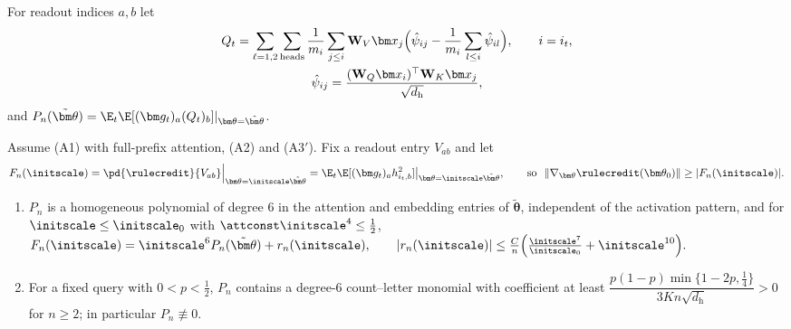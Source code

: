 For readout indices $a,b$ let
\begin{gather*}
 Q_t=\sum_{\ell=1,2}\sum_{\mathrm{heads}}\frac{1}{m_i}\sum_{j\le i}\mathbf W_V\bm x_j\Bigl(\hat\psi_{ij}-\frac{1}{m_i}\sum_{l\le i}\hat\psi_{il}\Bigr),\qquad i=i_t,\\
 \hat\psi_{ij}=\frac{(\mathbf W_Q\bm x_i)^\top\mathbf W_K\bm x_j}{\sqrt{d_{\mathrm h}}},
\end{gather*}
and $P_n(\tilde{\bm\theta})=\E_t\E[(\bm g_t)_a(Q_t)_b]|_{\bm\theta=\tilde{\bm\theta}}$.

\begin{lemma}
\label{lem:leading}
Assume (A1) with full-prefix attention, (A2) and (A3$'$). Fix a readout entry $V_{ab}$ and let
\[
 F_n(\initscale)=\pd{\rulecredit}{V_{ab}}\Big|_{\bm\theta=\initscale\tilde{\bm\theta}}=\E_t\E[(\bm g_t)_ah^2_{i_t,b}]\big|_{\bm\theta=\initscale\tilde{\bm\theta}},\qquad\text{so }\ \|\nabla_{\bm\theta}\rulecredit(\bm\theta_0)\|\ge|F_n(\initscale)|.
\]
\begin{enumerate}[label=(\roman*),leftmargin=*,itemsep=3pt,topsep=4pt]
\item $P_n$ is a homogeneous polynomial of degree $6$ in the attention and embedding entries of $\tilde{\bm\theta}$, independent of the activation
pattern, and for $\initscale\le\initscale_0$ with $\attconst\initscale^4\le\frac{1}{2}$,
 $F_n(\initscale)=\initscale^6P_n(\tilde{\bm\theta})+r_n(\initscale),\qquad |r_n(\initscale)|\le\frac{C}{n}\Bigl(\frac{\initscale^7}{\initscale_0}+\initscale^{10}\Bigr).$ 
\item For a fixed query with $0<p<\frac{1}{2}$, $P_n$ contains a degree-$6$ count--letter monomial with coefficient at least
$\dfrac{p(1-p)\min\{1-2p,\frac{1}{4}\}}{3Kn\sqrt{d_{\mathrm h}}}>0$ for $n\ge2$; in particular $P_n\not\equiv0$.
\end{enumerate}
\end{lemma}

